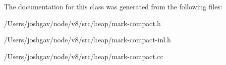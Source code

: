 The documentation for this class was generated from the following files\+:\begin{DoxyCompactItemize}
\item 
/\+Users/joshgav/node/v8/src/heap/mark-\/compact.\+h\item 
/\+Users/joshgav/node/v8/src/heap/mark-\/compact-\/inl.\+h\item 
/\+Users/joshgav/node/v8/src/heap/mark-\/compact.\+cc\end{DoxyCompactItemize}
